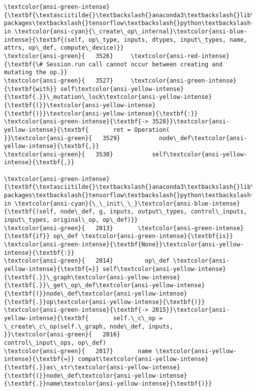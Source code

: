 \documentclass[11pt]{article}
\begin{document}
\begin{Verbatim}[commandchars=\\\{\}, frame=single, framerule=2mm, rulecolor=\color{outerrorbackground}]
\textcolor{ansi-green-intense}{\textbf{\textasciitilde{}\textbackslash{}anaconda3\textbackslash{}lib\textbackslash{}site-packages\textbackslash{}tensorflow\textbackslash{}python\textbackslash{}framework\textbackslash{}ops.py}} in \textcolor{ansi-cyan}{\_create\_op\_internal}\textcolor{ansi-blue-intense}{\textbf{(self, op\_type, inputs, dtypes, input\_types, name, attrs, op\_def, compute\_device)}}
\textcolor{ansi-green}{   3526}     \textcolor{ansi-red-intense}{\textbf{\# Session.run call cannot occur between creating and mutating the op.}}
\textcolor{ansi-green}{   3527}     \textcolor{ansi-green-intense}{\textbf{with}} self\textcolor{ansi-yellow-intense}{\textbf{.}}\_mutation\_lock\textcolor{ansi-yellow-intense}{\textbf{(}}\textcolor{ansi-yellow-intense}{\textbf{)}}\textcolor{ansi-yellow-intense}{\textbf{:}}
\textcolor{ansi-green-intense}{\textbf{-> 3528}}\textcolor{ansi-yellow-intense}{\textbf{       ret = Operation(
}}\textcolor{ansi-green}{   3529}           node\_def\textcolor{ansi-yellow-intense}{\textbf{,}}
\textcolor{ansi-green}{   3530}           self\textcolor{ansi-yellow-intense}{\textbf{,}}

\textcolor{ansi-green-intense}{\textbf{\textasciitilde{}\textbackslash{}anaconda3\textbackslash{}lib\textbackslash{}site-packages\textbackslash{}tensorflow\textbackslash{}python\textbackslash{}framework\textbackslash{}ops.py}} in \textcolor{ansi-cyan}{\_\_init\_\_}\textcolor{ansi-blue-intense}{\textbf{(self, node\_def, g, inputs, output\_types, control\_inputs, input\_types, original\_op, op\_def)}}
\textcolor{ansi-green}{   2013}       \textcolor{ansi-green-intense}{\textbf{if}} op\_def \textcolor{ansi-green-intense}{\textbf{is}} \textcolor{ansi-green-intense}{\textbf{None}}\textcolor{ansi-yellow-intense}{\textbf{:}}
\textcolor{ansi-green}{   2014}         op\_def \textcolor{ansi-yellow-intense}{\textbf{=}} self\textcolor{ansi-yellow-intense}{\textbf{.}}\_graph\textcolor{ansi-yellow-intense}{\textbf{.}}\_get\_op\_def\textcolor{ansi-yellow-intense}{\textbf{(}}node\_def\textcolor{ansi-yellow-intense}{\textbf{.}}op\textcolor{ansi-yellow-intense}{\textbf{)}}
\textcolor{ansi-green-intense}{\textbf{-> 2015}}\textcolor{ansi-yellow-intense}{\textbf{       self.\_c\_op = \_create\_c\_op(self.\_graph, node\_def, inputs,
}}\textcolor{ansi-green}{   2016}                                 control\_input\_ops, op\_def)
\textcolor{ansi-green}{   2017}       name \textcolor{ansi-yellow-intense}{\textbf{=}} compat\textcolor{ansi-yellow-intense}{\textbf{.}}as\_str\textcolor{ansi-yellow-intense}{\textbf{(}}node\_def\textcolor{ansi-yellow-intense}{\textbf{.}}name\textcolor{ansi-yellow-intense}{\textbf{)}}


\end{Verbatim}
\end{document}
